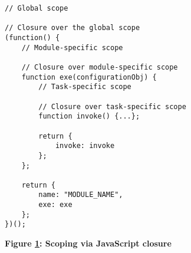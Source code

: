 \begin{figure}[H]
  \centering
  \begin{mdframed}[rightline=true,leftline=true]
    \begin{verbatim}
// Global scope

// Closure over the global scope
(function() {
    // Module-specific scope

    // Closure over module-specific scope
    function exe(configurationObj) {
        // Task-specific scope

        // Closure over task-specific scope
        function invoke() {...};

        return {
            invoke: invoke
        };
    };

    return {
        name: "MODULE_NAME",
        exe: exe
    };
})();
    \end{verbatim}
  \end{mdframed}
  \caption[Scoping via JavaScript closure]{\textbf{Figure \ref{fig-scope}: Scoping via JavaScript closure}}
  \label{fig-scope}
\end{figure}
